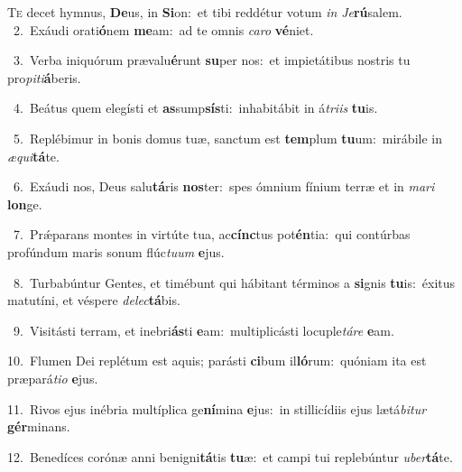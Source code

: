 \lettrine{\initial\textcolor{\initialcolor}{T}}{e} decet hymnus, \textbf{De}\-us, in \textbf{Si}\-on:~\star et tibi reddétur votum \textit{in} \textit{Je}\-\textbf{rú}salem.\\
{\numbfont\textcolor{\numbcolor}{~2.}}~Exáudi orati\-\textbf{ó}\-nem \textbf{me}\-am:~\star ad te omnis \textit{ca}\-\textit{ro} \textbf{vé}\-niet.\par
{\numbfont\textcolor{\numbcolor}{~3.}}~Verba iniquórum prævalu\-\textbf{é}\-runt \textbf{su}\-per nos:~\star et impietátibus nostris tu pro\-\textit{pi}\-\textit{ti}\textbf{á}beris.\par
{\numbfont\textcolor{\numbcolor}{~4.}}~Beátus quem elegísti et \textbf{as}\-sump\-\textbf{sís}\-ti:~\star inhabitábit in á\-\textit{tri}\-\textit{is} \textbf{tu}\-is.\par
{\numbfont\textcolor{\numbcolor}{~5.}}~Replébimur in bonis domus tuæ, sanctum est \textbf{tem}\-plum \textbf{tu}\-um:~\star mirábile in \textit{æ}\-\textit{qui}\textbf{tá}te.\par
{\numbfont\textcolor{\numbcolor}{~6.}}~Exáudi nos, Deus salu\-\textbf{tá}\-ris \textbf{nos}\-ter:~\star spes ómnium fínium terræ et in \textit{ma}\-\textit{ri} \textbf{lon}\-ge.\par
{\numbfont\textcolor{\numbcolor}{~7.}}~Prǽparans montes in virtúte tua, ac\-\textbf{cínc}\-tus pot\-\textbf{én}\-tia:~\star qui contúrbas profúndum maris sonum flúc\-\textit{tu}\-\textit{um} \textbf{e}\-jus.\par
{\numbfont\textcolor{\numbcolor}{~8.}}~Turbabúntur Gentes, et timébunt qui hábitant términos a \textbf{si}\-gnis \textbf{tu}\-is:~\star éxitus matutíni, et véspere \textit{de}\-\textit{lec}\textbf{tá}bis.\par
{\numbfont\textcolor{\numbcolor}{~9.}}~Visitásti terram, et inebri\-\textbf{ás}\-ti \textbf{e}\-am:~\star multiplicásti locuple\-\textit{tá}\-\textit{re} \textbf{e}\-am.\par
{\numbfont\textcolor{\numbcolor}{10.}}~Flumen Dei replétum est aquis; parásti \textbf{ci}\-bum il\-\textbf{ló}\-rum:~\star quóniam ita est præpará\-\textit{ti}\-\textit{o} \textbf{e}\-jus.\par
{\numbfont\textcolor{\numbcolor}{11.}}~Rivos ejus inébria multíplica ge\-\textbf{ní}\-mina \textbf{e}\-jus:~\star in stillicídiis ejus lætá\-\textit{bi}\-\textit{tur} \textbf{gér}\-minans.\par
{\numbfont\textcolor{\numbcolor}{12.}}~Benedíces corónæ anni benigni\-\textbf{tá}\-tis \textbf{tu}\-æ:~\star et campi tui replebúntur \textit{u}\-\textit{ber}\textbf{tá}te.\par
